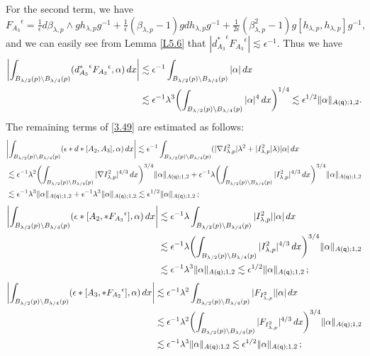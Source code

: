 \documentclass[11pt]{article}
\numberwithin{equation}{section} \setlength{\topmargin}{-35pt}
\newcommand{\q}{\mathsf{q}}
\begin{document}
For the second term, we have
${F_{A_3}}^{\epsilon}=\frac{1}{\epsilon}d\beta_{\lambda,p}\wedge
gh_{\lambda,p}g^{-1}+\frac{1}{\epsilon}(\beta_{\lambda,p}-1)gdh_{\lambda,p}g^{-1}+\frac{1}{2\epsilon}
(\beta_{\lambda,p}^2-1)g[h_{\lambda,p},h_{\lambda,p}]g^{-1},$ and we
can easily see from Lemma \ref{L5.6} that
$|{d_{A_3}^{\ast}}^{\epsilon}{F_{A_3}}^{\epsilon}|\lesssim\epsilon^{-1}$.
Thus we have
\begin{align}
\label{begin3} \biggl|\int_{B_{\lambda/2}(p)\setminus
B_{\lambda/4}(p)}({d_{A_3}^{\ast}}^{\epsilon}{F_{A_3}}^{\epsilon},\alpha)\,dx
\biggr|&
\lesssim\epsilon^{-1}\int_{B_{\lambda/2}(p)\setminus B_{\lambda/4}(p)}|\alpha|\,dx\notag\\
&\lesssim\epsilon^{-1}\lambda^3\biggl(\int_{B_{\lambda/2}(p)\setminus
B_{\lambda/4}(p)}|\alpha|^4\,dx\biggr)^{1/4}
\lesssim\epsilon^{1/2}\|\alpha\|_{A(\q);1,2}.
\end{align}
The remaining terms of \eqref{3.49} are estimated as follows:
\begin{align}
 &\biggl|\int_{B_{\lambda/2}(p)\setminus
B_{\lambda/4}(p)}(\epsilon\ast d\ast[A_2,A_3],\alpha)\,dx\biggr|
\lesssim \epsilon^{-1}\int_{B_{\lambda/2}(p)\setminus
B_{\lambda/4}(p)}(|\nabla
I^2_{\lambda,p}|\lambda^2+|I^2_{\lambda,p}|\lambda)|\alpha|\,dx
\notag\\
&\lesssim
\epsilon^{-1}\lambda^2\biggl(\int_{B_{\lambda/2}(p)\setminus
B_{\lambda/4}(p)}|\nabla I^2_{\lambda,p}|^{4/3}\,dx\biggr)^{3/4}
\|\alpha\|_{A(\q);1,2}+\epsilon^{-1}\lambda\biggl(\int_{B_{\lambda/2}(p)\setminus
B_{\lambda/4}(p)}|I^2_{\lambda,p}|^{4/3}\,dx\biggr)^{3/4}
\|\alpha\|_{A(\q);1,2}\notag\\
&\lesssim
 \epsilon^{-1}\lambda^3\|\alpha\|_{A(\q);1,2}+\epsilon^{-1}\lambda^3\|\alpha\|_{A(\q);1,2}\lesssim\epsilon^{1/2}\|\alpha\|_{A(\q);1,2}\,;
\end{align}
\begin{align}
\biggl|\int_{B_{\lambda/2}(p)\setminus
B_{\lambda/4}(p)}(\epsilon\ast[A_2,\ast
{F_{A_3}}^{\epsilon}],\alpha)\,dx\biggr|&
\lesssim\epsilon^{-1}\lambda\int_{B_{\lambda/2}(p)\setminus B_{\lambda/4}(p)}|I^2_{\lambda,p}||\alpha|\,dx\notag\\
&\lesssim\epsilon^{-1}\lambda\biggl(\int_{B_{\lambda/2}(p)\setminus
B_{\lambda/4}(p)}|I^2_{\lambda,p}|^{4/3}\,dx\biggr)^{3/4}
\|\alpha\|_{A(\q);1,2}\notag\\
&\lesssim\epsilon^{-1}\lambda^3\|\alpha\|_{A(\q);1,2}\lesssim\epsilon^{1/2}\|\alpha\|_{A(\q);1,2}\,;
\end{align}
\begin{align}
\biggl|\int_{B_{\lambda/2}(p)\setminus
B_{\lambda/4}(p)}(\epsilon\ast[A_3,\ast
{F_{A_2}}^{\epsilon}],\alpha)\,dx\biggr|&
\lesssim\epsilon^{-1}\lambda^2\int_{B_{\lambda/2}(p)\setminus B_{\lambda/4}(p)}|F_{I^2_{\lambda,p}}||\alpha|\,dx\notag\\
&\lesssim\epsilon^{-1}\lambda^2\biggl(\int_{B_{\lambda/2}(p)\setminus
B_{\lambda/4}(p)}|F_{I^2_{\lambda,p}}|^{4/3}\,dx\biggr)^{3/4}
\|\alpha\|_{A(\q);1,2}\notag\\
&\lesssim\epsilon^{-1}\lambda^3\|\alpha\|_{A(\q);1,2}\lesssim\epsilon^{1/2}\|\alpha\|_{A(\q);1,2}\,;
\end{align}
\end{document}
